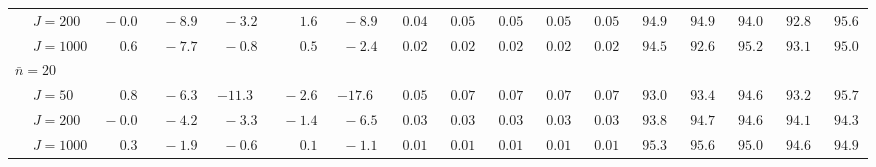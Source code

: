 \begin{sidewaystable}
\begin{threeparttable}
\begin{tabular}{llccccccccccccccc}
 & \nopagebreak $\;J=200$  & $\phantom{0}{-}0.0\phantom{0}$ & $\phantom{0}{-}8.9\phantom{0}$ & $\phantom{0}{-}3.2\phantom{0}$ & $\phantom{0}\phantom{-}1.6\phantom{0}$ & $\phantom{0}{-}8.9\phantom{0}$ & $\phantom{0}0.04\phantom{0}$ & $\phantom{0}0.05\phantom{0}$ & $\phantom{0}0.05\phantom{0}$ & $\phantom{0}0.05\phantom{0}$ & $\phantom{0}0.05\phantom{0}$ & $\phantom{0}94.9\phantom{0}$ & $\phantom{0}94.9\phantom{0}$ & $\phantom{0}94.0\phantom{0}$ & $\phantom{0}92.8\phantom{0}$ & $\phantom{0}95.6\phantom{0}$ \\
 & \nopagebreak $\;J=1000$  & $\phantom{0}\phantom{-}0.6\phantom{0}$ & $\phantom{0}{-}7.7\phantom{0}$ & $\phantom{0}{-}0.8\phantom{0}$ & $\phantom{0}\phantom{-}0.5\phantom{0}$ & $\phantom{0}{-}2.4\phantom{0}$ & $\phantom{0}0.02\phantom{0}$ & $\phantom{0}0.02\phantom{0}$ & $\phantom{0}0.02\phantom{0}$ & $\phantom{0}0.02\phantom{0}$ & $\phantom{0}0.02\phantom{0}$ & $\phantom{0}94.5\phantom{0}$ & $\phantom{0}92.6\phantom{0}$ & $\phantom{0}95.2\phantom{0}$ & $\phantom{0}93.1\phantom{0}$ & $\phantom{0}95.0\phantom{0}$ \\
\multicolumn{4}{l}{$\bar{n}=20$} \\  & \nopagebreak $\;J=50$  & $\phantom{0}\phantom{-}0.8\phantom{0}$ & $\phantom{0}{-}6.3\phantom{0}$ & ${-}11.3\phantom{0}$ & $\phantom{0}{-}2.6\phantom{0}$ & ${-}17.6\phantom{0}$ & $\phantom{0}0.05\phantom{0}$ & $\phantom{0}0.07\phantom{0}$ & $\phantom{0}0.07\phantom{0}$ & $\phantom{0}0.07\phantom{0}$ & $\phantom{0}0.07\phantom{0}$ & $\phantom{0}93.0\phantom{0}$ & $\phantom{0}93.4\phantom{0}$ & $\phantom{0}94.6\phantom{0}$ & $\phantom{0}93.2\phantom{0}$ & $\phantom{0}95.7\phantom{0}$ \\
 & \nopagebreak $\;J=200$  & $\phantom{0}{-}0.0\phantom{0}$ & $\phantom{0}{-}4.2\phantom{0}$ & $\phantom{0}{-}3.3\phantom{0}$ & $\phantom{0}{-}1.4\phantom{0}$ & $\phantom{0}{-}6.5\phantom{0}$ & $\phantom{0}0.03\phantom{0}$ & $\phantom{0}0.03\phantom{0}$ & $\phantom{0}0.03\phantom{0}$ & $\phantom{0}0.03\phantom{0}$ & $\phantom{0}0.03\phantom{0}$ & $\phantom{0}93.8\phantom{0}$ & $\phantom{0}94.7\phantom{0}$ & $\phantom{0}94.6\phantom{0}$ & $\phantom{0}94.1\phantom{0}$ & $\phantom{0}94.3\phantom{0}$ \\
 & \nopagebreak $\;J=1000$  & $\phantom{0}\phantom{-}0.3\phantom{0}$ & $\phantom{0}{-}1.9\phantom{0}$ & $\phantom{0}{-}0.6\phantom{0}$ & $\phantom{0}\phantom{-}0.1\phantom{0}$ & $\phantom{0}{-}1.1\phantom{0}$ & $\phantom{0}0.01\phantom{0}$ & $\phantom{0}0.01\phantom{0}$ & $\phantom{0}0.01\phantom{0}$ & $\phantom{0}0.01\phantom{0}$ & $\phantom{0}0.01\phantom{0}$ & $\phantom{0}95.3\phantom{0}$ & $\phantom{0}95.6\phantom{0}$ & $\phantom{0}95.0\phantom{0}$ & $\phantom{0}94.6\phantom{0}$ & $\phantom{0}94.9\phantom{0}$ \\

\end{tabular}
\end{threeparttable}
\end{sidewaystable}
